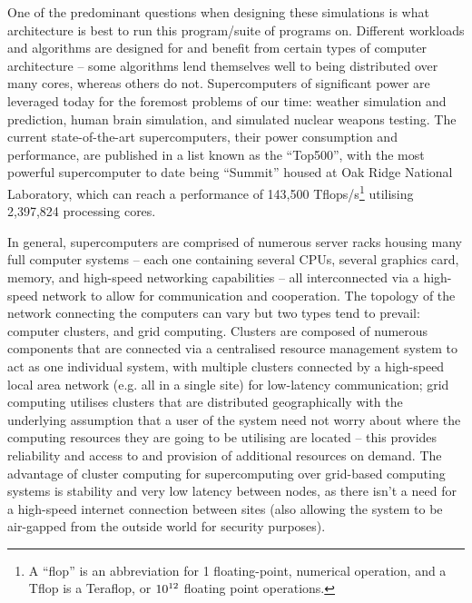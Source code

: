 \documentclass[conference]{IEEEtran}
\begin{document}
One of the predominant questions when designing these simulations is what architecture is best to run this program/suite of programs on. Different workloads and algorithms are designed for and benefit from certain types of computer architecture – some algorithms lend themselves well to being distributed over many cores, whereas others do not. Supercomputers of significant power are leveraged today for the foremost problems of our time: weather simulation and prediction\cite{metoffice}, human brain simulation\cite{humanbrain}, and simulated nuclear weapons testing\cite{nuclear}. The current state-of-the-art supercomputers, their power consumption and performance, are published in a list known as the ``Top500”\cite{top500}, with the most powerful supercomputer to date being ``Summit” housed at Oak Ridge National Laboratory, which can reach a performance of 143,500 Tflops/s\footnote{A ``flop” is an abbreviation for 1 floating-point, numerical operation, and a Tflop is a Teraflop, or $10\textsuperscript{12}$ floating point operations.} utilising 2,397,824 processing cores.

In general, supercomputers are comprised of numerous server racks housing many full computer systems – each one containing several CPUs, several graphics card, memory, and high-speed networking capabilities – all interconnected via a high-speed network to allow for communication and cooperation. The topology of the network connecting the computers can vary but two types tend to prevail: computer clusters, and grid computing. Clusters are composed of numerous components that are connected via a centralised resource management system to act as one individual system, with multiple clusters connected by a high-speed local area network (e.g. all in a single site) for low-latency communication; grid computing utilises clusters that are distributed geographically with the underlying assumption that a user of the system need not worry about where the computing resources they are going to be utilising are located – this provides reliability and access to and provision of additional resources on demand. The advantage of cluster computing for supercomputing over grid-based computing systems is stability and very low latency between nodes, as there isn’t a need for a high-speed internet connection between sites (also allowing the system to be air-gapped from the outside world for security purposes).
\end{document}
